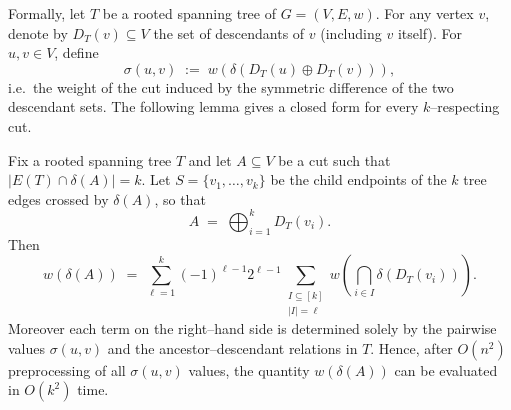 \documentclass[11pt,letterpaper]{article}
\begin{document}
Formally, let $T$ be a rooted spanning tree of $G=(V,E,w)$.
For any vertex $v$, denote by $D_T(v)\subseteq V$ the set of descendants of $v$
(including $v$ itself).
For $u,v\in V$, define
\[
\sigma(u,v) \;:=\; w\!\left(\delta(D_T(u)\oplus D_T(v))\right),
\]
i.e.\ the weight of the cut induced by the symmetric difference of
the two descendant sets.
The following lemma gives a closed form for every $k$--respecting cut.

\begin{lemma}
\label{lem:krespect-eval}
Fix a rooted spanning tree $T$ and let $A\subseteq V$ be a cut
such that $|E(T)\cap \delta(A)|=k$.
Let $S=\{v_1,\dots,v_k\}$ be the child endpoints of the $k$ tree edges
crossed by $\delta(A)$, so that
\[
A \;=\; \bigoplus_{i=1}^k D_T(v_i).
\]
Then
\begin{equation}
\label{eq:inclusion-exclusion}
w(\delta(A)) \;=\;
\sum_{\ell=1}^k (-1)^{\ell-1} 2^{\ell-1}
  \sum_{\substack{I\subseteq [k]\\ |I|=\ell}}
  w\!\left( \bigcap_{i\in I} \delta(D_T(v_i)) \right).
\end{equation}
Moreover each term on the right--hand side is determined solely by the pairwise
values $\sigma(u,v)$ and the ancestor--descendant relations in $T$.
Hence, after $O(n^2)$ preprocessing of all $\sigma(u,v)$ values,
the quantity $w(\delta(A))$ can be evaluated in $O(k^2)$ time.
\end{lemma}
\end{document}
